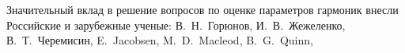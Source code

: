Значительный вклад в решение вопросов по оценке параметров гармоник внесли Российские и зарубежные ученые: 
В.~Н.~Горюнов, 
И.~В.~Жежеленко,
В.~Т.~Черемисин,
E.~Jacobsen, 
M.~D.~Macleod,
B.~G.~Quinn,
